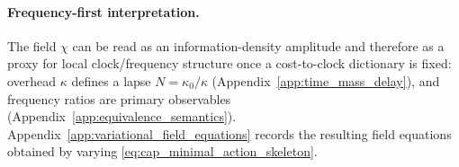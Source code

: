 \paragraph{Frequency-first interpretation.}
\InterfaceTag The field $\chi$ can be read as an information-density amplitude and therefore as a proxy for local clock/frequency structure once a cost-to-clock dictionary is fixed:
overhead $\kappa$ defines a lapse $N=\kappa_0/\kappa$ (Appendix~\ref{app:time_mass_delay}), and frequency ratios are primary observables (Appendix~\ref{app:equivalence_semantics}).
Appendix~\ref{app:variational_field_equations} records the resulting field equations obtained by varying \eqref{eq:cap_minimal_action_skeleton}.


